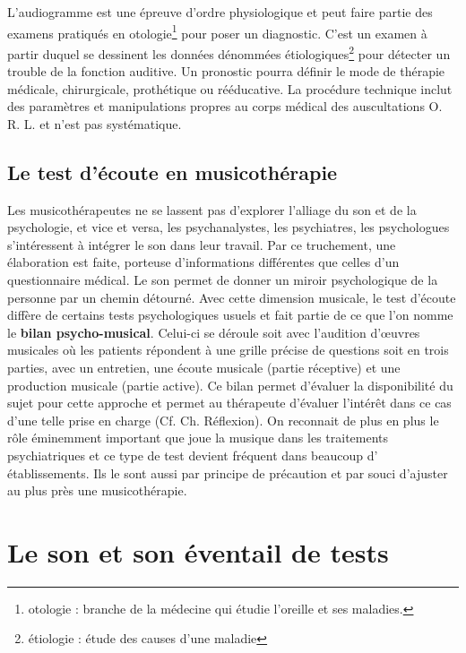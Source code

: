   L'audiogramme est une épreuve d'ordre physiologique et peut faire partie des examens  pratiqués en otologie\footnote{otologie : branche de la médecine
  	qui étudie l'oreille et ses maladies.} pour poser un diagnostic. 
   C'est un examen à partir duquel se
  dessinent les données dénommées étiologiques\footnote{étiologie : étude des causes
  	d'une maladie} pour détecter un trouble de la fonction auditive. Un pronostic pourra définir le mode de thérapie
médicale, chirurgicale, prothétique ou rééducative. La procédure
technique inclut des paramètres et manipulations propres au corps
médical des auscultations O. R. L. et  n'est pas systématique.






\subsection{Le test d'écoute en musicothérapie}

Les musicothérapeutes ne se lassent pas d'explorer l'alliage du son
 et de la psychologie, et vice
 et versa, les psychanalystes, les psychiatres, les psychologues
 s'intéressent à intégrer le son dans leur travail. Par ce truchement,
 une élaboration est faite, porteuse d'informations différentes que
 celles d'un questionnaire médical. Le son permet de donner un miroir
 psychologique de la personne par un chemin détourné. Avec cette dimension
 musicale, le test d'écoute diffère de certains tests psychologiques usuels
 et fait partie de ce que l'on nomme le \textbf{ bilan
   psycho-musical}. Celui-ci se déroule soit avec l'audition d'\oe uvres
 musicales où les patients répondent à une grille précise de questions
  soit en trois parties, avec un entretien,
 une écoute musicale (partie réceptive) et une production musicale
 (partie active).
Ce bilan permet d'évaluer la disponibilité du sujet pour cette
approche et permet au thérapeute d'évaluer l'intérêt dans ce cas
d'une telle prise en charge (Cf. Ch. Réflexion).
 On reconnait de plus en plus le rôle éminemment important que joue la musique
 dans les traitements psychiatriques et ce type de test devient
 fréquent dans beaucoup d' établissements. Ils le sont aussi par principe de précaution et
 par souci d'ajuster au plus près une
 musicothérapie.



  
\section{Le son et son éventail de tests}
\label{musicothEtpsycho}

